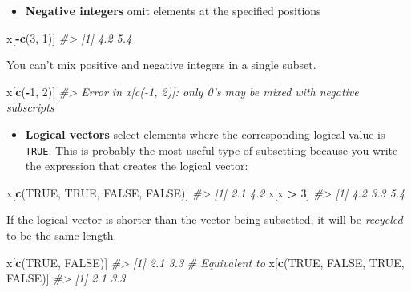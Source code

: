 \documentclass[]{book}
\newenvironment{Shaded}{\begin{snugshade}}{\end{snugshade}}
\newcommand{\CommentTok}[1]{\textcolor[rgb]{0.56,0.35,0.01}{\textit{#1}}}
\newcommand{\DecValTok}[1]{\textcolor[rgb]{0.00,0.00,0.81}{#1}}
\newcommand{\KeywordTok}[1]{\textcolor[rgb]{0.13,0.29,0.53}{\textbf{#1}}}
\newcommand{\NormalTok}[1]{#1}
\newcommand{\OperatorTok}[1]{\textcolor[rgb]{0.81,0.36,0.00}{\textbf{#1}}}
\newcommand{\OtherTok}[1]{\textcolor[rgb]{0.56,0.35,0.01}{#1}}
\newcommand{\StringTok}[1]{\textcolor[rgb]{0.31,0.60,0.02}{#1}}
\providecommand{\tightlist}{%
  \setlength{\itemsep}{0pt}\setlength{\parskip}{0pt}}
\theoremstyle{definition}
\theoremstyle{definition}
\theoremstyle{definition}
\theoremstyle{remark}
\begin{document}
\begin{itemize}
\tightlist
\item
  \textbf{Negative integers} omit elements at the specified positions
\end{itemize}

\begin{Shaded}
\begin{Highlighting}[]
\NormalTok{x[}\OperatorTok{-}\KeywordTok{c}\NormalTok{(}\DecValTok{3}\NormalTok{, }\DecValTok{1}\NormalTok{)]}
\CommentTok{#> [1] 4.2 5.4}
\end{Highlighting}
\end{Shaded}

You can't mix positive and negative integers in a single subset.

\begin{Shaded}
\begin{Highlighting}[]
\NormalTok{x[}\KeywordTok{c}\NormalTok{(}\OperatorTok{-}\DecValTok{1}\NormalTok{, }\DecValTok{2}\NormalTok{)]}
\CommentTok{#> Error in x[c(-1, 2)]: only 0's may be mixed with negative subscripts}
\end{Highlighting}
\end{Shaded}

\begin{itemize}
\tightlist
\item
  \textbf{Logical vectors} select elements where the corresponding
  logical value is \texttt{TRUE}. This is probably the most useful type
  of subsetting because you write the expression that creates the
  logical vector:
\end{itemize}

\begin{Shaded}
\begin{Highlighting}[]
\NormalTok{x[}\KeywordTok{c}\NormalTok{(}\OtherTok{TRUE}\NormalTok{, }\OtherTok{TRUE}\NormalTok{, }\OtherTok{FALSE}\NormalTok{, }\OtherTok{FALSE}\NormalTok{)]}
\CommentTok{#> [1] 2.1 4.2}
\NormalTok{x[x }\OperatorTok{>}\StringTok{ }\DecValTok{3}\NormalTok{]}
\CommentTok{#> [1] 4.2 3.3 5.4}
\end{Highlighting}
\end{Shaded}

If the logical vector is shorter than the vector being subsetted, it
will be \emph{recycled} to be the same length.

\begin{Shaded}
\begin{Highlighting}[]
\NormalTok{x[}\KeywordTok{c}\NormalTok{(}\OtherTok{TRUE}\NormalTok{, }\OtherTok{FALSE}\NormalTok{)]}
\CommentTok{#> [1] 2.1 3.3}
\CommentTok{# Equivalent to}
\NormalTok{x[}\KeywordTok{c}\NormalTok{(}\OtherTok{TRUE}\NormalTok{, }\OtherTok{FALSE}\NormalTok{, }\OtherTok{TRUE}\NormalTok{, }\OtherTok{FALSE}\NormalTok{)]}
\CommentTok{#> [1] 2.1 3.3}
\end{Highlighting}
\end{Shaded}
\end{document}
